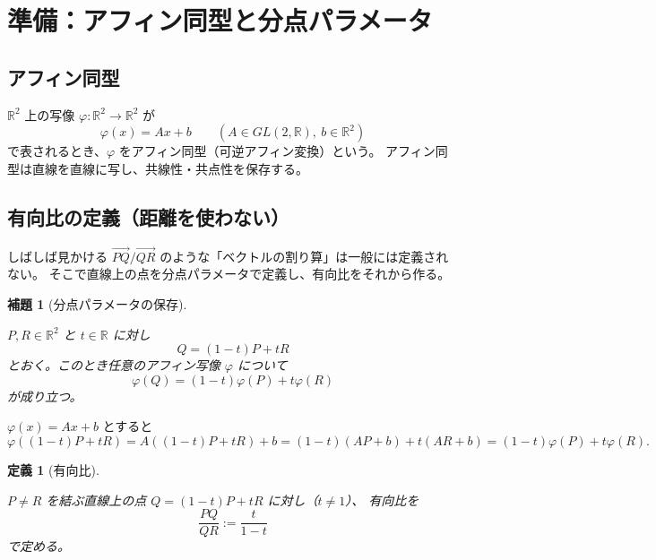 \documentclass[a4paper,12pt]{bxjsbook}
\makeatletter
\newlength{\customindent}
\newenvironment{body}{
  \par
  \begingroup
  \setlength{\leftskip}{\customindent}
  \setlength{\rightskip}{0pt}
  \setlength{\parindent}{1em}
  \setlength{\displayindent}{\customindent}
  \setlength{\displaywidth}{\dimexpr\linewidth-\customindent\relax}
}{
  \par
  \endgroup
}
\theoremstyle{theorem}
\newtheorem{lemma}[theorem]{補題}
\newtheorem{definition}[theorem]{定義}
\renewenvironment{proof}[1][\proofname]{%
  \par\pushQED{\qed}%
  \normalfont
  \topsep6\p@\@plus6\p@\relax
  \list{}{%
    \leftmargin=\customindent
    \rightmargin=0pt
    \labelwidth=0pt
    \labelsep=0pt
    \itemindent=0pt
    \listparindent=0pt
    \parsep=0pt
  }%
  \item[\itshape #1\@addpunct{.}\hspace{0.5em}]%
  \setlength{\displayindent}{\customindent}%
  \setlength{\displaywidth}{\dimexpr\linewidth-\customindent\relax}%
  \ignorespaces
}{%
  \popQED\endlist\@endpefalse
}
\makeatother
\begin{document}
    \section{準備：アフィン同型と分点パラメータ}
    \subsection{アフィン同型}
    \begin{body}
        $\mathbb{R}^2$ 上の写像 $\varphi:\mathbb{R}^2\to\mathbb{R}^2$ が
        \[
            \varphi(x)=Ax+b \qquad (A\in GL(2,\mathbb{R}),\ b\in\mathbb{R}^2)
        \]
        で表されるとき、$\varphi$ をアフィン同型（可逆アフィン変換）という。
        アフィン同型は直線を直線に写し、共線性・共点性を保存する。
    \end{body}

    \subsection{有向比の定義（距離を使わない）}
    \begin{body}
        しばしば見かける $\overrightarrow{PQ}/\overrightarrow{QR}$ のような「ベクトルの割り算」は一般には定義されない。
        そこで直線上の点を分点パラメータで定義し、有向比をそれから作る。
    \end{body}

    \begin{lemma}[分点パラメータの保存]\label{lem:aff_param}
        \begin{body}
            $P,R\in\mathbb{R}^2$ と $t\in\mathbb{R}$ に対し
            \[
                Q=(1-t)P+tR
            \]
            とおく。このとき任意のアフィン写像 $\varphi$ について
            \[
                \varphi(Q)=(1-t)\varphi(P)+t\varphi(R)
            \]
            が成り立つ。
        \end{body}
    \end{lemma}
    \begin{proof}
        \begin{body}
            $\varphi(x)=Ax+b$ とすると
            \[
                \varphi((1-t)P+tR)=A((1-t)P+tR)+b=(1-t)(AP+b)+t(AR+b) =(1-t)\varphi(P)+t\varphi(R).
            \]
        \end{body}
    \end{proof}

    \begin{definition}[有向比]\label{def:dir_ratio}
        \begin{body}
            $P\neq R$ を結ぶ直線上の点 $Q=(1-t)P+tR$ に対し（$t\neq 1$）、
            有向比を
            \[
                \frac{PQ}{QR}:=\frac{t}{1-t}
            \]
            で定める。
        \end{body}
    \end{definition}
\end{document}
